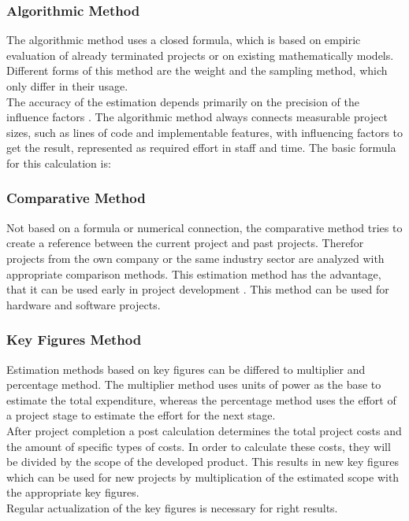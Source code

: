 \subsubsection{Algorithmic Method}

The algorithmic method uses a closed formula, which is based on empiric evaluation of already terminated projects or on existing mathematically models. Different forms of this method are the weight and the sampling method, which only differ in their usage.\\
The accuracy of the estimation depends primarily on the precision of the influence factors \cite{itplanung}. The algorithmic method always connects measurable project sizes, such as lines of code and implementable features, with influencing factors to get the result, represented as required effort in staff and time. The basic formula for this calculation is:\\

\subsubsection{Comparative Method}

Not based on a formula or numerical connection, the comparative method tries to create a reference between the current project and past projects. Therefor projects from the own company or the same industry sector are analyzed with appropriate comparison methods. This estimation method has the advantage, that it can be used early in project development \cite{itplanung}. This method can be used for hardware and software projects.

\subsubsection{Key Figures Method}

Estimation methods based on key figures can be differed to multiplier and percentage  method. The multiplier method uses units of power as the base to estimate the total expenditure, whereas the percentage method uses the effort of a project stage to estimate the effort for the next stage.\\
After project completion a post calculation determines the total project costs and the amount of specific types of costs. In order to calculate these costs, they will be divided by the scope of the developed product. This results in new key figures which can be used for new projects by multiplication of the estimated scope with the appropriate key figures.\\
\cite{itplanung} Regular actualization of the key figures is necessary for right results.\\

